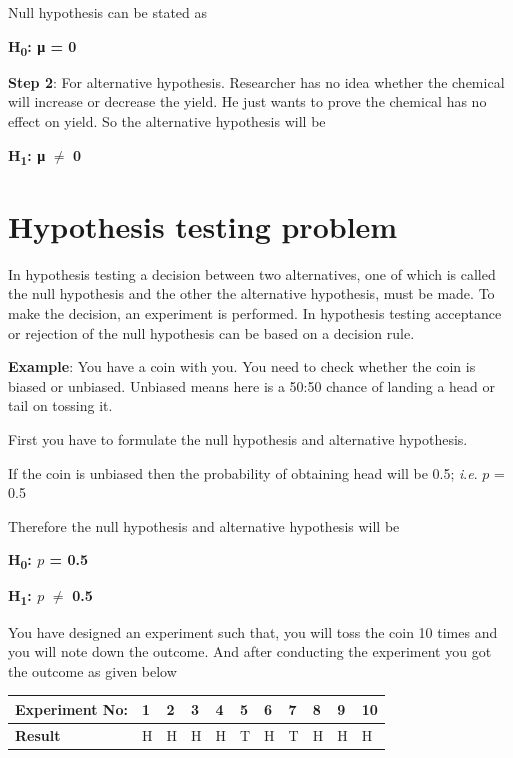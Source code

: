 \documentclass[
]{book}
\begin{document}
Null hypothesis can be stated as

\textbf{H\textsubscript{0}: μ = 0}

\textbf{Step 2}: For alternative hypothesis. Researcher has no idea whether the chemical will increase or decrease the yield. He just wants to prove the chemical has no effect on yield. So the alternative hypothesis will be

\textbf{H\textsubscript{1}: μ} \(\mathbf{\neq}\) \textbf{0}

\hypertarget{hypo}{%
\section{Hypothesis testing problem}\label{hypo}}

In hypothesis testing a decision between two alternatives, one of which is called the null hypothesis and the other the alternative hypothesis, must be made. To make the decision, an experiment is performed. In hypothesis testing acceptance or rejection of the null hypothesis can be based on a decision rule.

\textbf{Example}: You have a coin with you. You need to check whether the coin is biased or unbiased. Unbiased means here is a 50:50 chance of landing a head or tail on tossing it.

First you have to formulate the null hypothesis and alternative hypothesis.

If the coin is unbiased then the probability of obtaining head will be 0.5; \emph{i}.\emph{e}. \(p\) = 0.5

Therefore the null hypothesis and alternative hypothesis will be

\textbf{H\textsubscript{0}: \(p\) = 0.5}

\textbf{H\textsubscript{1}: \(p\)} \(\mathbf{\neq}\) \textbf{0.5}

You have designed an experiment such that, you will toss the coin 10 times and you will note down the outcome. And after conducting the experiment you got the outcome as given below

\begin{longtable}[]{@{}lllllllllll@{}}
\toprule\noalign{}
\textbf{Experiment No}: & 1 & 2 & 3 & 4 & 5 & 6 & 7 & 8 & 9 & 10 \\
\midrule\noalign{}
\endhead
\bottomrule\noalign{}
\endlastfoot
\textbf{Result} & H & H & H & H & T & H & T & H & H & H \\
\end{longtable}
\end{document}
